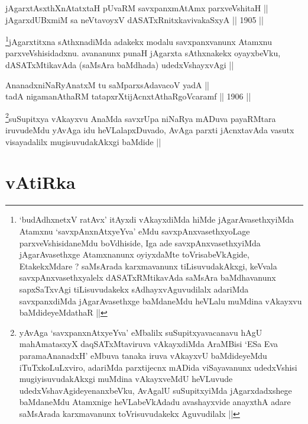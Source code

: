 
\begin{shl}
jAgarxtAsxthXnAtatxtaH pUvaRM savxpanxmAtAmx parxveVshitaH || \\
jAgarxdUBxmiM sa neVtavoyxV dASATxRnitxkavivakaSxyA ||  1905 ||  
\end{shl}

\begin{artha}
\footnote[1]{`budAdhxnetxV ratAvx' itAyxdi vAkayxdiMda hiMde
  jAgarAvasethxyiMda Atamxnu `savxpAnxnAtxyeYva' eMdu
  savxpAnxvasethxyoLage parxveVshisidaneMdu boVdhiside, Iga ade
  savxpAnxvasethxyiMda jAgarAvasethxge Atamxnanunx oyiyxdaMte
  toVrisabeVkAgide, EtakekxMdare ? saMsArada karxmavanunx
  tiLisuvudakAkxgi, keVvala savxpAnxvasethxyalelx dASATxRMtikavAda
  saMsAra baMdhavanunx sapxSaTxvAgi tiLisuvudakekx sAdhayxvAguvudilalx
  adariMda savxpanxdiMda jAgarAvasethxge baMdaneMdu heVLalu muMdina
  vAkayxvu baMdideyeMdathaR ||}jAgarxtitxna sAthxnadiMda adakekx modalu savxpanxvanunx
Atamxnu parxveVshisidadxnu. avananunx punaH jAgarxta sAthxnakekx
oyayxbeVku, dASATxMtikavAda (saMsAra baMdhada) udedxVshayxvAgi ||
\end{artha}


\begin{shl}
AnanadxniNaRyAnatxM tu saMparxsAdavacoV yadA || \\
tadA nigamanAthaRM tatapxrXtijAcnxtAthaRgoVcaramf ||  1906 ||  
\end{shl}

\begin{artha}
\footnote[2]{yAvAga `savxpanxnAtxyeYva'
  eMbalilx suSupitxyavacanavu hAgU mahAmatasxyX daqSATxMtaviruva
  vAkayxdiMda AraMBisi `ESa Eva paramaAnanadxH' eMbuva tanaka iruva
  vAkayxvU baMdideyeMdu iTuTxkoLuLxviro, adariMda parxtijecnx mADida
  viSayavanunx udedxVshisi mugiyisuvudakAkxgi muMdina vAkayxveMdU
  heVLuvude udedxVshavAgideyenanxbeVku, AvAgalU suSupitxyiMda
  jAgarxdadxshege baMdaneMdu Atamxnige heVLabeVkAdadu avashayxvide
  anayxthA adare saMsArada karxmavanunx toVrisuvudakekx Aguvudilalx ||}suSupitxya vAkayxvu AnaMda savxrUpa
niNaRya mADuva payaRMtara iruvudeMdu yAvAga idu heVLalapxDuvado, AvAga
parxti jAcnxtavAda vasutx visayadalilx mugisuvudakAkxgi baMdide ||
\end{artha}

\section*{vAtiRka}

